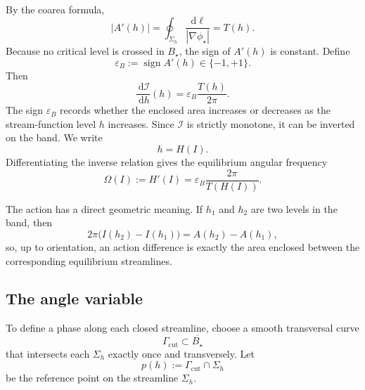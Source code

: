 \documentclass[11pt,a4paper]{article}
\newcommand{\dd}{\,\mathrm{d}}
\newcommand{\abs}[1]{\left|#1\right|}
\begin{document}
By the coarea formula,
\begin{equation}
  \abs{A'(h)}
  =\oint_{\Sigma_h}\frac{\dd\ell}{\abs{\nabla\phi_\star}}
  =T(h).
  \label{eq:area-period-relation}
\end{equation}
Because no critical level is crossed in $B_\star$, the sign of $A'(h)$ is constant. Define
\begin{equation}
  \varepsilon_{B}
  :=\operatorname{sign}A'(h)\in\{-1,+1\}.
  \label{eq:band-orientation}
\end{equation}
Then
\begin{equation}
  \frac{\dd\mathcal{I}}{\dd h}(h)
  =\varepsilon_B\frac{T(h)}{2\pi}.
  \label{eq:action-derivative}
\end{equation}
The sign $\varepsilon_B$ records whether the enclosed area increases or decreases as the stream-function level $h$ increases. Since $\mathcal I$ is strictly monotone, it can be inverted on the band. We write
\begin{equation}
  h=H(I).
  \label{eq:H-inverse-action}
\end{equation}
Differentiating the inverse relation gives the equilibrium angular frequency
\begin{equation}
  \Omega(I)
  :=H'(I)
  =\varepsilon_B\frac{2\pi}{T(H(I))}.
  \label{eq:orbital-frequency}
\end{equation}

The action has a direct geometric meaning. If $h_1$ and $h_2$ are two levels in the band, then
\begin{equation}
  2\pi\bigl(I(h_2)-I(h_1)\bigr)
  =A(h_2)-A(h_1),
  \label{eq:action-area-difference}
\end{equation}
so, up to orientation, an action difference is exactly the area enclosed between the corresponding equilibrium streamlines.

\subsection{The angle variable}

To define a phase along each closed streamline, choose a smooth transversal curve
\begin{equation}
  \Gamma_{\mathrm{cut}}\subset\overline{B_\star}
\end{equation}
that intersects each $\Sigma_h$ exactly once and transversely. Let
\begin{equation}
  p(h):=\Gamma_{\mathrm{cut}}\cap\Sigma_h
\end{equation}
be the reference point on the streamline $\Sigma_h$.
\end{document}

